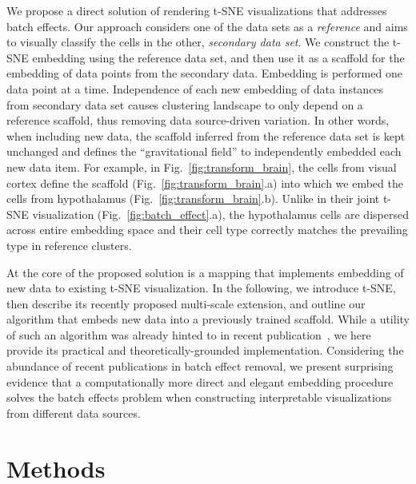 \documentclass[runningheads]{llncs}
\begin{document}
We propose a direct solution of rendering t-SNE visualizations that addresses
batch effects. Our approach considers one of the data sets as a {\em reference}
and aims to visually classify the cells in the other, {\em secondary data set}.
We construct the t-SNE embedding using the reference data set, and then use it
as a scaffold for the embedding of data points from the secondary data.
Embedding is performed one data point at a time. Independence of each new
embedding of data instances from secondary data set causes clustering landscape
to only depend on a reference scaffold, thus removing data source-driven
variation. In other words, when including new data, the scaffold inferred from
the reference data set is kept unchanged and defines the ``gravitational
field'' to independently embedded each new data item. For example, in
Fig.~\ref{fig:transform_brain}, the cells from visual cortex define the
scaffold (Fig.~\ref{fig:transform_brain}.a) into which we embed the cells from
hypothalamus (Fig.~\ref{fig:transform_brain}.b). Unlike in their joint t-SNE
visualization (Fig.~\ref{fig:batch_effect}.a), the hypothalamus cells are
dispersed across entire embedding space and their cell type correctly matches
the prevailing type in reference clusters.

At the core of the proposed solution is a mapping that implements embedding of
new data to existing t-SNE visualization. In the following, we introduce t-SNE,
then describe its recently proposed multi-scale extension, and outline our
algorithm that embeds new data into a previously trained scaffold. While a
utility of such an algorithm was already hinted to in recent
publication~\cite{art_of_using_tsne}, we here provide its practical and
theoretically-grounded implementation. Considering the abundance of recent
publications in batch effect removal, we present surprising evidence that a
computationally more direct and elegant embedding procedure solves the batch
effects problem when constructing interpretable visualizations from different
data sources.


\section{Methods}
\end{document}
